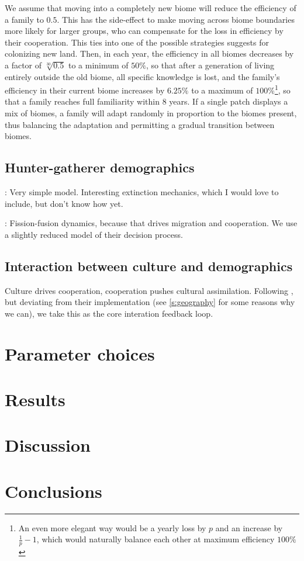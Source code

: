 \documentclass[a4paper,12pt]{scrartcl}
\begin{document}
We assume that moving into a completely new biome will reduce the efficiency of
a family to $0.5$. This has the side-effect to make moving across biome
boundaries more likely for larger groups, who can compensate for the loss in
efficiency by their cooperation. This ties into one of the possible strategies
\textcite{kelly2003colonization} suggests for colonizing new land. Then, in each
year, the efficiency in all biomes decreases by a factor of $\sqrt[30]{0.5}$ to
a minimum of $50\%$, so that after a generation of living entirely outside the
old biome, all specific knowledge is lost, and the family's efficiency in their
current biome increases by $6.25\%$ to a maximum of $100\%$\footnote{An even
  more elegant way would be a yearly loss by $p$ and an increase by $\frac{1}{p}
  -1$, which would naturally balance each other at maximum efficiency $100\%$}, so
that a family reaches full familiarity within 8 years. If a single patch
displays a mix of biomes, a family will adapt randomly in proportion to the
biomes present, thus balancing the adaptation and permitting a gradual
transition between biomes.

\subsection{Hunter-gatherer demographics}
\label{s:demographics}

\textcite{hamilton2018stochastic}: Very simple model. Interesting extinction
mechanics, which I would love to include, but don't know how yet.

\textcite{crema2014simulation}: Fission-fusion dynamics, because that drives
migration and cooperation. We use a slightly reduced model of their decision
process.

\subsection{Interaction between culture and demographics}
\label{s:interaction}

Culture drives cooperation, cooperation pushes cultural assimilation. Following
\parencite{barcelo2014social,barcelo2015simulating}, but deviating from their
implementation (see \cref{s:geography} for some reasons why we can), we take this
as the core interation feedback loop.


\section{Parameter choices}
\label{s:parameters}
\section{Results}
\label{s:results}
\section{Discussion}
\label{s:discussion}
\section{Conclusions}
\label{s:conclusions}

\printbibliography
\end{document}
